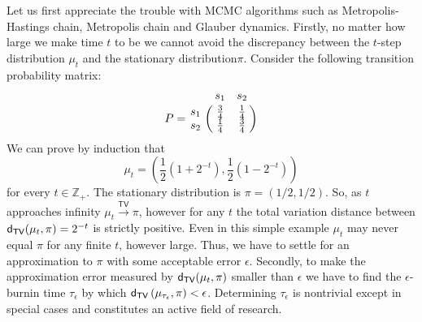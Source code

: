 Let us first appreciate the trouble with MCMC algorithms such as Metropolis-Hastings chain, Metropolis chain and Glauber dynamics.  
Firstly, no matter how large we make time $t$ to be we cannot avoid the discrepancy between the $t$-step distribution $\mu_t$ and the stationary distribution$\pi$.  
Consider the following transition probability matrix:
\[
P = 
\bordermatrix{~ & s_1 & s_2 \cr
s_1 & \frac{3}{4} & \frac{1}{4}  \cr
s_2 & \frac{1}{4} & \frac{3}{4} }
\]
We can prove by induction that 
$$\mu_t=\left(\frac{1}{2}\left(1+2^{-t}\right), \frac{1}{2}\left(1-2^{-t}\right)\right)$$
for every $t \in \mathbb{Z}_+$.  
The stationary distribution is $\pi=(1/2,1/2)$.  
So, as $t$ approaches infinity $\mu_t \overset{\mathsf{TV}}{\longrightarrow} \pi$, however for any $t$ the total variation distance between $\mathsf{d_{TV}}(\mu_t,\pi) = 2^{-t}$ is strictly positive.  
Even in this simple example $\mu_t$ may never equal $\pi$ for any finite $t$, however large.
Thus, we have to settle for an approximation to $\pi$ with some acceptable error $\epsilon$.  
Secondly, to make the approximation error measured by $\mathsf{d_{TV}}(\mu_t,\pi)$ smaller than $\epsilon$ we have to find the $\epsilon$-burnin time $\tau_{\epsilon}$ by which $\mathsf{d_{TV}} \left(\mu_{\tau_{\epsilon}},\pi\right) < \epsilon$.  
Determining $\tau_{\epsilon}$ is nontrivial except in special cases and constitutes an active field of research.  




